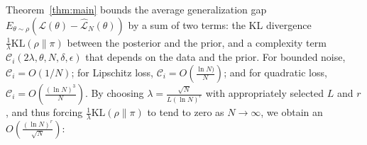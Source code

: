 \documentclass{article}
\newcommand{\KL}{\mathrm{KL}}
\renewcommand{\KL}{\mathrm{KL}}
\begin{document}
Theorem~\ref{thm:main} bounds the average generalization gap $E_{\theta \sim \rho} \left(\mathcal{L}(\theta) - \hat{\mathcal{L}}_N(\theta)\right)$ by a sum of two terms: the KL divergence $\frac{1}{\lambda}\KL(\rho \| \pi)$ between the posterior and the prior, and a complexity term $\mathcal{C}_i(2\lambda,\theta,N,\delta,\epsilon)$ that depends on the data and the prior. For bounded noise, $\mathcal{C}_i = O(1/N)$; for Lipschitz loss, $\mathcal{C}_i = O(\frac{\ln N)}{N})$; and for quadratic loss, $\mathcal{C}_i = O(\frac{(\ln N)^3}{N})$. By choosing $\lambda = \frac{\sqrt{N}}{L(\ln N)^r}$ with appropriately selected $L$ and $r$, and thus forcing $\frac{1}{\lambda}\KL(\rho \| \pi)$ to tend to zero as $N \to \infty$, we obtain an $O\left(\frac{(\ln N)^r}{\sqrt{N}} \right)$:
\end{document}
